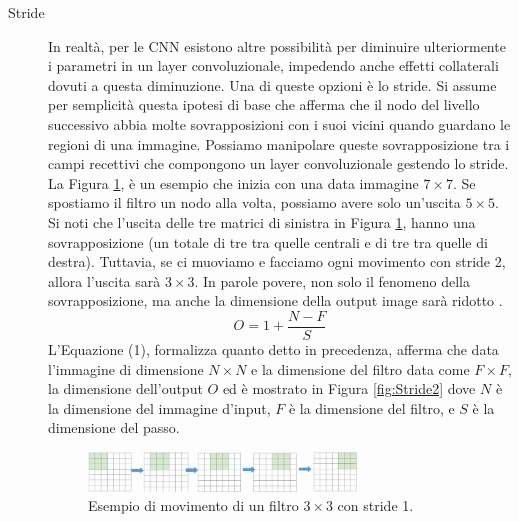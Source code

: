\begin{description}
\begin{description}
        \item[Stride] In realtà, per le CNN esistono altre possibilità per diminuire ulteriormente i parametri
        in un layer convoluzionale, impedendo anche effetti collaterali dovuti a questa diminuzione. Una di
        queste opzioni è lo stride. Si assume per semplicità questa ipotesi di base che afferma che il nodo del
        livello successivo abbia molte sovrapposizioni con i suoi vicini quando guardano le regioni di una
        immagine. Possiamo manipolare queste sovrapposizione tra i campi recettivi che compongono un layer
        convoluzionale gestendo lo stride. La Figura \ref{fig:Stride}, è un esempio che inizia con una data
        immagine $7\times 7$. Se spostiamo il filtro un nodo alla volta, possiamo avere solo un'uscita 
        $5 \times 5$. Si noti che l'uscita delle tre matrici di sinistra in Figura \ref{fig:Stride}, hanno 
        una sovrapposizione (un totale di tre tra quelle centrali e di tre tra quelle di destra). Tuttavia, 
        se ci muoviamo e facciamo ogni movimento con stride 2, allora l'uscita sarà $3 \times 3$. 
        In parole povere, non solo il fenomeno della sovrapposizione, ma anche la dimensione della output 
        image sarà ridotto \cite{o2015introduction}.
        \[ O=1+\frac{N-F}{S} \tag{1} \]
        L'Equazione (1), formalizza quanto detto in precedenza, afferma che data l'immagine di dimensione 
        $N \times N$ e la dimensione del filtro data come $F \times F$, la dimensione dell'output $O$ ed è 
        mostrato in Figura \ref{fig:Stride2} dove $N$ è la dimensione del immagine d'input, $F$ è la dimensione 
        del filtro, e $S$ è la dimensione del passo.

        \begin{figure}[h]
            \centering
            \includegraphics[width=0.7\textwidth]{images/CNN/fig_Stride.png}
            \caption{Esempio di movimento di un filtro $3 \times 3$ con stride 1. \cite{8308186}}
            \label{fig:Stride}
        \end{figure}
    

\end{description}
\end{description}
